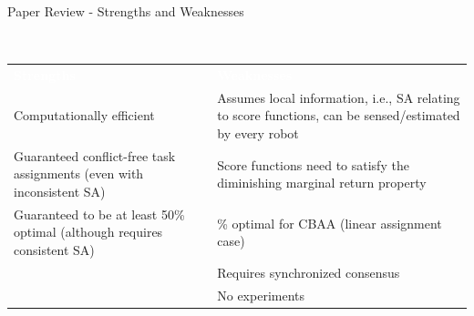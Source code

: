 \begin{frame}{Paper Review - Strengths and Weaknesses}
    \begin{block}{~\vspace{0.7cm}}
        \begin{center}
        \vspace{-1.0cm}
        \setcellgapes{4pt}\makegapedcells
        \begin{tabular}{>{\centering}p{}|>{\centering\arraybackslash}p{}}
         \textcolor{white}{\bfseries\boldmath Strengths} & \textcolor{white}{\bfseries Weaknesses} \\
        Computationally efficient %
        &  Assumes local information, i.e., SA relating to score functions, can be sensed/estimated by every robot \\ 
       Guaranteed conflict-free task assignments (even with inconsistent SA) & Score functions need to satisfy the diminishing marginal return property \\  
       Guaranteed to be at least 50\% optimal (although requires consistent SA)
        & 50\% optimal for CBAA (linear assignment case) \\ &  Requires synchronized consensus \\
        & No experiments
        \end{tabular}
        \end{center}
    \end{block}
\end{frame}
